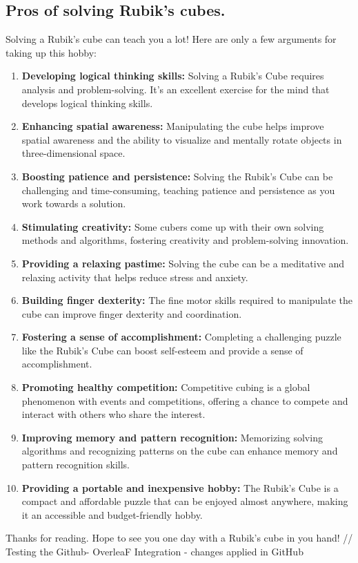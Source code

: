 \subsection{Pros of solving Rubik's cubes.}

Solving a Rubik's cube can teach you a lot! Here are only a few arguments for taking up this hobby:

\begin{enumerate} 
    \item \textbf{Developing logical thinking skills:} Solving a Rubik's Cube requires analysis and problem-solving. It's an excellent exercise for the mind that develops logical thinking skills.
    \item \textbf{Enhancing spatial awareness:} Manipulating the cube helps improve spatial awareness and the ability to visualize and mentally rotate objects in three-dimensional space.
    \item \textbf{Boosting patience and persistence:} Solving the Rubik's Cube can be challenging and time-consuming, teaching patience and persistence as you work towards a solution.
    \item \textbf{Stimulating creativity:} Some cubers come up with their own solving methods and algorithms, fostering creativity and problem-solving innovation.
    \item \textbf{Providing a relaxing pastime:} Solving the cube can be a meditative and relaxing activity that helps reduce stress and anxiety.
    \item \textbf{Building finger dexterity:} The fine motor skills required to manipulate the cube can improve finger dexterity and coordination.
    \item \textbf{Fostering a sense of accomplishment:} Completing a challenging puzzle like the Rubik's Cube can boost self-esteem and provide a sense of accomplishment.
    \item \textbf{Promoting healthy competition:} Competitive cubing is a global phenomenon with events and competitions, offering a chance to compete and interact with others who share the interest.
    \item \textbf{Improving memory and pattern recognition:} Memorizing solving algorithms and recognizing patterns on the cube can enhance memory and pattern recognition skills.
    \item \textbf{Providing a portable and inexpensive hobby:} The Rubik's Cube is a compact and affordable puzzle that can be enjoyed almost anywhere, making it an accessible and budget-friendly hobby.

\end{enumerate}

\vspace{0,5cm}
Thanks for reading. Hope to see you one day with a Rubik's cube in you hand!
// Testing the Github- OverleaF Integration - changes applied in GitHub








